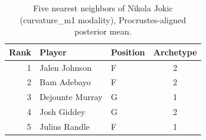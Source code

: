 \begin{table}[htbp]
  \centering\small
  \begin{tabular}{rllc}
    \toprule
    Rank & Player & Position & Archetype \\
    \midrule
    1 & Jalen Johnson & F & 2 \\
    2 & Bam Adebayo & F & 2 \\
    3 & Dejounte Murray & G & 1 \\
    4 & Josh Giddey & G & 2 \\
    5 & Julius Randle & F & 1 \\
    \bottomrule
  \end{tabular}
  \caption{Five nearest neighbors of Nikola Jokic (curvature_m1 modality), Procrustes-aligned posterior mean.}
  \label{tab:Nikola_Jokic_neighbors_curvature_m1}
\end{table}

